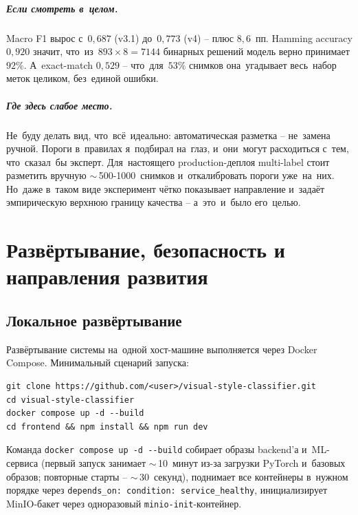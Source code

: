 \documentclass[a4paper,12pt]{diplom}
\begin{document}
\paragraph{Если смотреть в~целом.} Macro F1 вырос с~$0{,}687$ (v3.1) до~$0{,}773$ (v4) -- плюс $8{,}6$~пп. Hamming accuracy $0{,}920$ значит, что~из~$893 \times 8 = 7144$ бинарных решений модель верно принимает $92\%$. А~exact-match $0{,}529$ -- что~для~$53\%$ снимков она~угадывает весь~набор меток целиком, без~единой ошибки.

\paragraph{Где здесь слабое место.} Не~буду делать вид, что~всё~идеально: автоматическая разметка -- не~замена ручной. Пороги в~правилах я~подбирал на~глаз, и~они~могут расходиться с~тем, что~сказал~бы эксперт. Для~настоящего production-деплоя multi-label стоит разметить вручную $\sim$\,500-1000~снимков и~откалибровать пороги уже~на~них. Но~даже в~таком виде эксперимент чётко показывает направление и~задаёт эмпирическую верхнюю границу качества -- а~это~и~было его~целью.

\chapter{Развёртывание, безопасность и направления развития}
\label{ch:deploy}

\section{Локальное развёртывание}
\label{sec:local_deploy}

Развёртывание системы на~одной хост-машине выполняется через Docker Compose. Минимальный сценарий запуска:

\begin{lstlisting}[basicstyle=\ttfamily\small,frame=single,caption={Команды запуска системы},label=lst:run]
git clone https://github.com/<user>/visual-style-classifier.git
cd visual-style-classifier
docker compose up -d --build
cd frontend && npm install && npm run dev
\end{lstlisting}

Команда \verb|docker compose up -d --build| собирает образы backend'а и~ML-сервиса (первый запуск занимает $\sim$\,10~минут из-за загрузки PyTorch и~базовых образов; повторные старты -- $\sim$\,30~секунд), поднимает все контейнеры в~нужном порядке через \verb|depends_on: condition: service_healthy|, инициализирует MinIO-бакет через одноразовый \texttt{minio-init}-контейнер.
\end{document}
